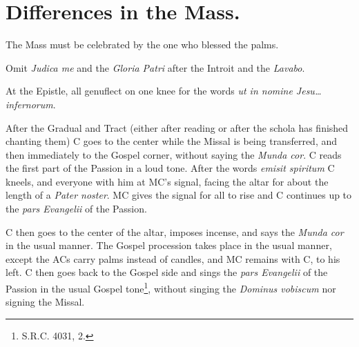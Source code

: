 {	\section{Differences in the Mass.}

	\rubric The Mass must be celebrated by the one who blessed the palms.

	\rubric Omit \textit{Judica me} and the \textit{Gloria Patri} after the
	Introit and the \textit{Lavabo}.

	\rubric At the Epistle, all genuflect on one knee for the words \textit{ut
	in nomine Jesu\dots infernorum}.

	\rubric After the Gradual and Tract (either after reading or after the
	schola has finished chanting them) C goes to the center while the Missal is
	being transferred, and then immediately to the Gospel corner, without
	saying the \textit{Munda cor}. C reads the first part of the Passion in a
	loud tone. After the words \textit{emisit spiritum} C kneels, and everyone
	with him at MC's signal, facing the altar for about the length of a
	\textit{Pater noster}. MC gives the signal for all to rise and C continues
	up to the \textit{pars Evangelii} of the Passion. 

    \rubric C then goes to the center of the altar, imposes incense, and says
    the \textit{Munda cor} in the usual manner. The Gospel procession takes
    place in the usual manner, except the ACs carry palms instead of candles,
    and MC remains with C, to his left. C then goes back to the Gospel side and
    sings the \textit{pars Evangelii} of the Passion in the usual Gospel
    tone\footnote{S.R.C. 4031, 2.}, without singing the \textit{Dominus
    vobiscum} nor signing the Missal.

	}
